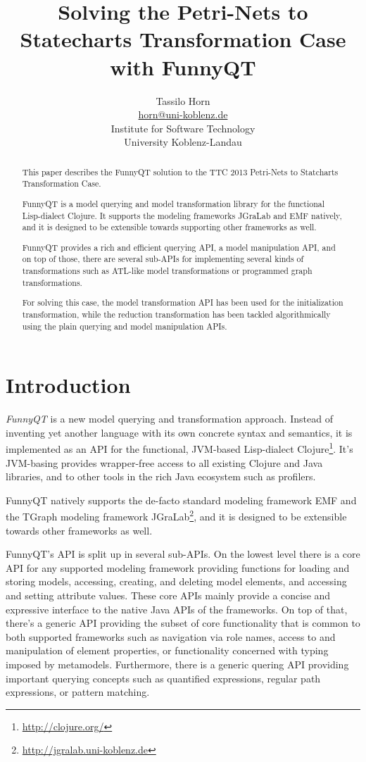 \documentclass[11pt]{article}
\title{Solving the Petri-Nets to Statecharts Transformation Case with FunnyQT}
\author{Tassilo Horn\\
  \href{mailto:horn@uni-koblenz.de}{horn@uni-koblenz.de}\\
  Institute for Software Technology\\
  University Koblenz-Landau}
\begin{document}
\maketitle

\begin{abstract}
  This paper describes the FunnyQT solution to the TTC 2013 Petri-Nets to
  Statcharts Transformation Case.

  FunnyQT is a model querying and model transformation library for the
  functional Lisp-dialect Clojure.  It supports the modeling frameworks JGraLab
  and EMF natively, and it is designed to be extensible towards supporting
  other frameworks as well.

  FunnyQT provides a rich and efficient querying API, a model manipulation API,
  and on top of those, there are several sub-APIs for implementing several
  kinds of transformations such as ATL-like model transformations or programmed
  graph transformations.

  For solving this case, the model transformation API has been used for the
  initialization transformation, while the reduction transformation has been
  tackled algorithmically using the plain querying and model manipulation APIs.
\end{abstract}

\section{Introduction}
\label{sec:introduction}

\emph{FunnyQT} is a new model querying and transformation approach.  Instead of
inventing yet another language with its own concrete syntax and semantics, it
is implemented as an API for the functional, JVM-based Lisp-dialect
Clojure\footnote{\url{http://clojure.org/}}.  It's JVM-basing provides
wrapper-free access to all existing Clojure and Java libraries, and to other
tools in the rich Java ecosystem such as profilers.

FunnyQT natively supports the de-facto standard modeling framework EMF
\cite{Steinberg2008EEM} and the TGraph modeling framework
JGraLab\footnote{\url{http://jgralab.uni-koblenz.de}}, and it is designed to be
extensible towards other frameworks as well.

FunnyQT's API is split up in several sub-APIs.  On the lowest level there is a
core API for any supported modeling framework providing functions for loading
and storing models, accessing, creating, and deleting model elements, and
accessing and setting attribute values.  These core APIs mainly provide a
concise and expressive interface to the native Java APIs of the frameworks.  On
top of that, there's a generic API providing the subset of core functionality
that is common to both supported frameworks such as navigation via role names,
access to and manipulation of element properties, or functionality concerned
with typing imposed by metamodels.  Furthermore, there is a generic quering API
providing important querying concepts such as quantified expressions, regular
path expressions, or pattern matching.
\end{document}

